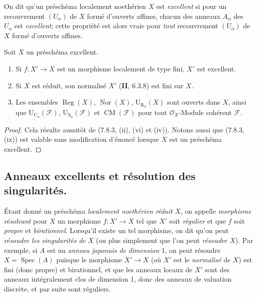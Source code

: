 \begin{env}[7.8.5]
\label{IV.2.s7.8.5-fr}
On dit qu'un préschéma localement noethérien $X$ est \emph{excellent} si pour
un recouvrement $(U_\alpha)$ de $X$ formé d'ouverts affines, chacun des anneaux
$A_\alpha$ des $U_\alpha$ est \emph{excellent}; cette propriété est alors vraie pour
\emph{tout} recouvrement $(U_\alpha)$ de $X$ formé d'ouverts affines.
\end{env}

\begin{proposition}[7.8.6]
Soit $X$ un préschéma excellent.
\begin{enumerate}
\item[\emph{(i)}] Si $f:X'\to X$ est un morphisme localement de type fini, $X'$ est
excellent.


\item[\emph{(ii)}] Si $X$ est réduit, son normalisé $X'$ \textup{(\textbf{II}, 6.3.8)} est fini
sur $X$.
\item[\emph{(iii)}] Les ensembles $\operatorname{Reg}(X)$, $\operatorname{Nor}(X)$,
$\mathrm U_{\mathrm R_n}(X)$ sont ouverts dans $X$, ainsi que
$\mathrm U_{\mathrm C_n}(\mathcal F)$, $\mathrm U_{\mathrm S_n}(\mathcal F)$
et $\operatorname{CM}(\mathcal F)$ pour tout $\mathcal O_X$-Module cohérent
$\mathcal F$.
\end{enumerate}
\end{proposition}

\begin{proof}
Cela résulte aussitôt de (7.8.3, (ii), (vi) et (iv)). Notons aussi que (7.8.3,
(ix)) est valable sans modification d'énoncé lorsque $X$ est un préschéma
excellent.
\end{proof}

\subsection{Anneaux excellents et résolution des singularités.}
\label{subsection:IV.2.7.9-fr}

\begin{env}[7.9.1]
\label{IV.2.s7.9.1-fr}
Étant donné un préschéma \emph{localement noethérien réduit} $X$, on appelle
\emph{morphisme résolvant} pour $X$ un morphisme $f:X'\to X$ tel que $X'$ soit
\emph{régulier} et que $f$ soit \emph{propre} et \emph{birationnel}. Lorsqu'il
existe un tel morphisme, on dit qu'on peut \emph{résoudre les singularités de}
$X$ (ou plus simplement que l'on peut \emph{résoudre} $X$). Par exemple, si
$A$ est un \emph{anneau japonais de dimension} $1$, on peut résoudre
$X=\operatorname{Spec}(A)$ puisque le morphisme $X'\to X$ (où $X'$ est le
\emph{normalisé} de $X$) est fini (donc propre) et birationnel, et que les
anneaux locaux de $X'$ sont des anneaux intégralement clos de dimension $1$,
donc des anneaux de valuation discrète, et par suite sont réguliers.
\end{env}

